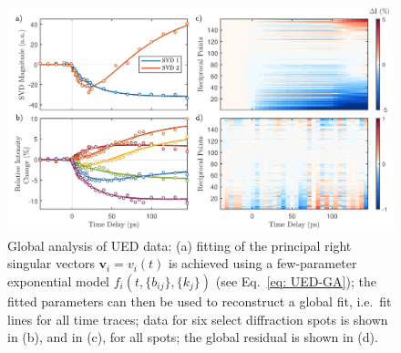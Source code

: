 \begin{figure}[t!]
  \centering
  \includegraphics[width = \textwidth]{Figures/fig_UED_svdfit.pdf}
  \caption[Global analysis of UED data.]{
  Global analysis of UED data:
  (a) fitting of the principal right singular vectors $\mathbf{v}_i = v_i(t)$ is achieved
  using a few-parameter exponential model $f_i(t, \{ b_{i j}\}, \{k_j\})$ (see Eq.~\eqref{eq: UED-GA});
  the fitted parameters can then be used to reconstruct a global fit,
  i.e.~fit lines for all time traces;
  data for six select diffraction spots is shown in (b),
  and in (c), for all spots;
  the global residual is shown in (d).
  }
  \label{fig: UED-svdfit}
\end{figure}



